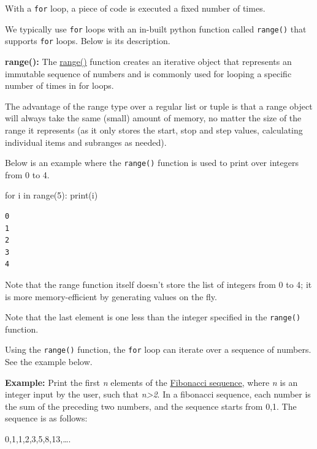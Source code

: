 \documentclass[
  letterpaper,
  DIV=11,
  numbers=noendperiod]{scrreprt}
\newenvironment{Shaded}{\begin{snugshade}}{\end{snugshade}}
\newcommand{\BuiltInTok}[1]{\textcolor[rgb]{0.00,0.23,0.31}{#1}}
\newcommand{\ControlFlowTok}[1]{\textcolor[rgb]{0.00,0.23,0.31}{#1}}
\newcommand{\DecValTok}[1]{\textcolor[rgb]{0.68,0.00,0.00}{#1}}
\newcommand{\KeywordTok}[1]{\textcolor[rgb]{0.00,0.23,0.31}{#1}}
\newcommand{\NormalTok}[1]{\textcolor[rgb]{0.00,0.23,0.31}{#1}}
\begin{document}
With a \texttt{for} loop, a piece of code is executed a fixed number of
times.

We typically use \texttt{for} loops with an in-built python function
called \texttt{range()} that supports \texttt{for} loops. Below is its
description.

\textbf{range():} The
\href{https://docs.python.org/3/library/functions.html\#func-range}{range()}
function creates an iterative object that represents an immutable
sequence of numbers and is commonly used for looping a specific number
of times in for loops.

The advantage of the range type over a regular list or tuple is that a
range object will always take the same (small) amount of memory, no
matter the size of the range it represents (as it only stores the start,
stop and step values, calculating individual items and subranges as
needed).

Below is an example where the \texttt{range()} function is used to print
over integers from 0 to 4.

\begin{Shaded}
\begin{Highlighting}[]
\ControlFlowTok{for}\NormalTok{ i }\KeywordTok{in} \BuiltInTok{range}\NormalTok{(}\DecValTok{5}\NormalTok{):}
    \BuiltInTok{print}\NormalTok{(i)}
\end{Highlighting}
\end{Shaded}

\begin{verbatim}
0
1
2
3
4
\end{verbatim}

Note that the range function itself doesn't store the list of integers
from 0 to 4; it is more memory-efficient by generating values on the
fly.

Note that the last element is one less than the integer specified in the
\texttt{range()} function.

Using the \texttt{range()} function, the \texttt{for} loop can iterate
over a sequence of numbers. See the example below.

\textbf{Example:} Print the first \emph{n} elements of the
\href{https://en.wikipedia.org/wiki/Fibonacci_number}{Fibonacci
sequence}, where \emph{n} is an integer input by the user, such that
\emph{n\textgreater2}. In a fibonacci sequence, each number is the sum
of the preceding two numbers, and the sequence starts from 0,1. The
sequence is as follows:

0,1,1,2,3,5,8,13,\ldots.
\end{document}
